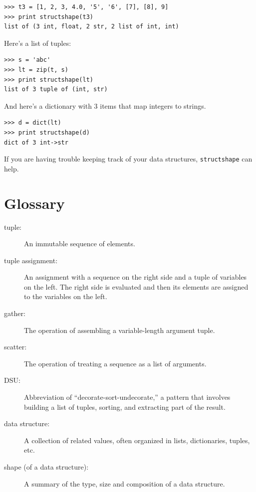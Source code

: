\documentclass[10pt]{book}
\begin{document}
\begin{verbatim}
>>> t3 = [1, 2, 3, 4.0, '5', '6', [7], [8], 9]
>>> print structshape(t3)
list of (3 int, float, 2 str, 2 list of int, int)
\end{verbatim}
%
Here's a list of tuples:

\begin{verbatim}
>>> s = 'abc'
>>> lt = zip(t, s)
>>> print structshape(lt)
list of 3 tuple of (int, str)
\end{verbatim}
%
And here's a dictionary with 3 items that map integers to strings.

\begin{verbatim}
>>> d = dict(lt)
>>> print structshape(d)
dict of 3 int->str
\end{verbatim}
%
If you are having trouble keeping track of your data structures,
{\tt structshape} can help.


\section{Glossary}

\begin{description}

\item[tuple:] An immutable sequence of elements.

\item[tuple assignment:] An assignment with a sequence on the
right side and a tuple of variables on the left.  The right
side is evaluated and then its elements are assigned to the
variables on the left.

\item[gather:] The operation of assembling a variable-length
argument tuple.

\item[scatter:] The operation of treating a sequence as a list of
arguments.

\item[DSU:] Abbreviation of ``decorate-sort-undecorate,'' a
pattern that involves building a list of tuples, sorting, and
extracting part of the result.

\item[data structure:] A collection of related values, often
organized in lists, dictionaries, tuples, etc.

\item[shape (of a data structure):] A summary of the type,
size and composition of a data structure.

\end{description}
\end{document}
